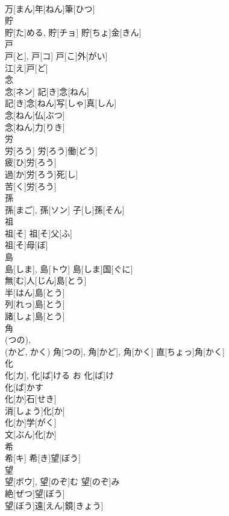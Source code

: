 \documentclass[8pt]{extreport}
\begin{document}
\begin{CJK}{UTF8}{min}
\\	万[まん]年[ねん]筆[ひつ]	
\\	貯	
\\	貯[た]める, 貯[チョ]	貯[ちょ]金[きん] 
\\	戸	
\\	戸[と], 戸[コ]	戸[こ]外[がい] 
\\	江[え]戸[ど] 
\\	念	
\\	念[ネン]	記[き]念[ねん] 
\\	記[き]念[ねん]写[しゃ]真[しん] 
\\	念[ねん]仏[ぶつ] 
\\	念[ねん]力[りき] 
\\	労	
\\	労[ろう]	労[ろう]働[どう] 
\\	疲[ひ]労[ろう] 
\\	過[か]労[ろう]死[し] 
\\	苦[く]労[ろう] 
\\	孫	
\\	孫[まご], 孫[ソン]	子[し]孫[そん] 
\\	祖	
\\	祖[そ]	祖[そ]父[ふ] 
\\	祖[そ]母[ぼ] 
\\	島	
\\	島[しま], 島[トウ]	島[しま]国[ぐに] 
\\	無[む]人[じん]島[とう] 
\\	半[はん]島[とう] 
\\	列[れっ]島[とう] 
\\	諸[しょ]島[とう] 
\\	角	
\\	(つの), 
\\	(かど, かく)	角[つの], 角[かど], 角[かく]	直[ちょっ]角[かく] 
\\	化	
\\	化[カ], 化[ば]ける	お 化[ば]け 
\\	化[ば]かす 
\\	化[か]石[せき] 
\\	消[しょう]化[か] 
\\	化[か]学[がく] 
\\	文[ぶん]化[か] 
\\	希	
\\	希[キ]	希[き]望[ぼう] 
\\	望	
\\	望[ボウ], 望[のぞ]む	望[のぞ]み 
\\	絶[ぜつ]望[ぼう] 
\\	望[ぼう]遠[えん]鏡[きょう] 

\end{CJK}
\end{document}
